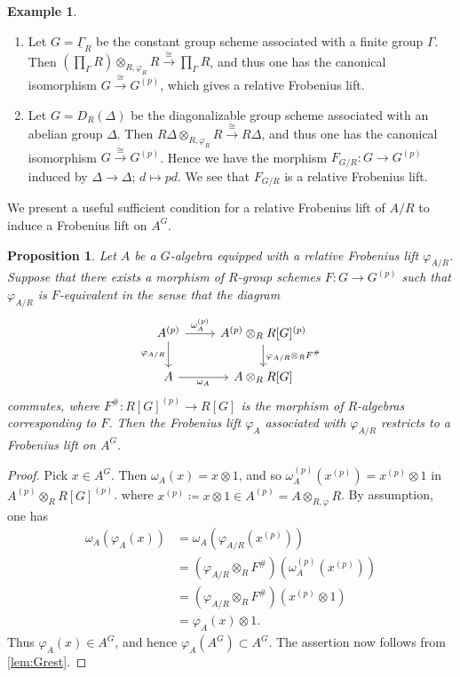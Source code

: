 \documentclass[uplatex,11pt,a4paper]{amsart} %
\numberwithin{equation}{section}
\numberwithin{figure}{section}
\numberwithin{table}{section}
\theoremstyle{plain}
\newtheorem{proposition}[theorem]{Proposition}
\theoremstyle{definition}
\newtheorem{example}[theorem]{Example}
\newcommand{\ul}{\underline}
\newcommand{\xr}{\xrightarrow}
\begin{document}
\begin{example}
\label{ex:FG}
  \begin{enumerate}
  \item Let $G=\ul{\Gamma}_R$ be the constant group scheme associated with a finite group $\Gamma$. Then $\left(\prod\limits_\Gamma R\right)\otimes_{R,\varphi_R}R\xr{\cong} \prod\limits_\Gamma R$, and thus one has the canonical isomorphism $G\xr{\cong} G^{(p)}$, which gives a relative Frobenius lift.
  \item Let $G=D_R(\Delta)$ be the diagonalizable group scheme associated with an abelian group $\Delta$. Then $R\Delta\otimes_{R,\varphi_R}R \xr{\cong} R\Delta$, and thus one has the canonical isomorphism $G\xr{\cong}G^{(p)}$. Hence we have the morphism $F_{G/R}\colon G\to G^{(p)}$ induced by $\Delta\to\Delta$; $d\mapsto pd$. We see that $F_{G/R}$ is a relative Frobenius lift.
  \end{enumerate}
\end{example}

We present a useful sufficient condition for a relative Frobenius lift of $A/R$ to induce a Frobenius lift on $A^G$.

\begin{proposition}
\label{prop:Fequiv}
Let $A$ be a $G$-algebra equipped with a relative Frobenius lift $\varphi_{A/R}$.
Suppose that there exists a morphism of $R$-group schemes $F\colon G\to G^{(p)}$ such that $\varphi_{A/R}$ is \emph{$F$-equivalent} in the sense that the diagram
\begin{equation}
\label{eq:psi}
\begin{tikzcd}
A^{(p)} \rar["\omega_A^{(p)}"] \dar["\varphi_{A/R}"'] & A^{(p)}\otimes_R R[G]^{(p)} \dar["\varphi_{A/R}\otimes_R F^\#"] \\
A \rar["\omega_A"'] & A\otimes_RR[G]
\end{tikzcd}
\end{equation}
commutes, where $F^\#\colon R[G]^{(p)}\to R[G]$ is the morphism of $R$-algebras corresponding to $F$. Then the Frobenius lift $\varphi_A$ associated with $\varphi_{A/R}$ restricts to a Frobenius lift on $A^G$.
\end{proposition}

\begin{proof}
Pick $x\in A^G$. Then $\omega_A(x)=x\otimes 1$, and so $\omega_A^{(p)}(x^{(p)}) = x^{(p)}\otimes 1$ in $A^{(p)}\otimes_RR[G]^{(p)}$. where $x^{(p)}\coloneqq x\otimes 1 \in A^{(p)}=A\otimes_{R,\varphi}R$. By assumption, one has
\begin{align*}
\omega_A\left(\varphi_A(x)\right) &= \omega_A\left(\varphi_{A/R}(x^{(p)})\right) \\
&= (\varphi_{A/R}\otimes_RF^\#)\left(\omega_A^{(p)}(x^{(p)})\right) \\
&= (\varphi_{A/R}\otimes_RF^\#)(x^{(p)}\otimes1) \\
&= \varphi_A(x)\otimes 1.
\end{align*}
Thus $\varphi_A(x)\in A^G$, and hence $\varphi_A(A^G)\subset A^G$. The assertion now follows from \cref{lem:Grest}.
\end{proof}
\end{document}
